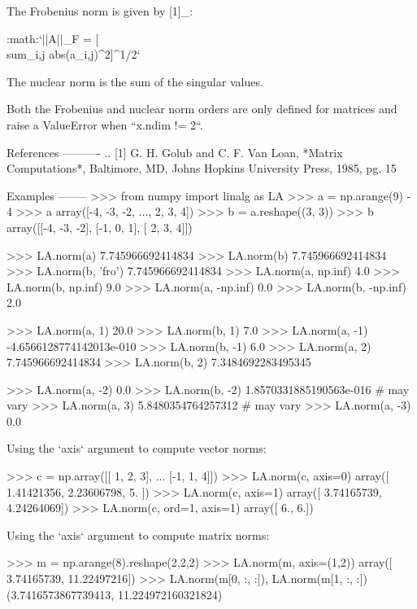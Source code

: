 \begin{DoxyVerb}
The Frobenius norm is given by [1]_:

    :math:`||A||_F = [\\sum_{i,j} abs(a_{i,j})^2]^{1/2}`

The nuclear norm is the sum of the singular values.

Both the Frobenius and nuclear norm orders are only defined for
matrices and raise a ValueError when ``x.ndim != 2``.

References
----------
.. [1] G. H. Golub and C. F. Van Loan, *Matrix Computations*,
       Baltimore, MD, Johns Hopkins University Press, 1985, pg. 15

Examples
--------
>>> from numpy import linalg as LA
>>> a = np.arange(9) - 4
>>> a
array([-4, -3, -2, ...,  2,  3,  4])
>>> b = a.reshape((3, 3))
>>> b
array([[-4, -3, -2],
       [-1,  0,  1],
       [ 2,  3,  4]])

>>> LA.norm(a)
7.745966692414834
>>> LA.norm(b)
7.745966692414834
>>> LA.norm(b, 'fro')
7.745966692414834
>>> LA.norm(a, np.inf)
4.0
>>> LA.norm(b, np.inf)
9.0
>>> LA.norm(a, -np.inf)
0.0
>>> LA.norm(b, -np.inf)
2.0

>>> LA.norm(a, 1)
20.0
>>> LA.norm(b, 1)
7.0
>>> LA.norm(a, -1)
-4.6566128774142013e-010
>>> LA.norm(b, -1)
6.0
>>> LA.norm(a, 2)
7.745966692414834
>>> LA.norm(b, 2)
7.3484692283495345

>>> LA.norm(a, -2)
0.0
>>> LA.norm(b, -2)
1.8570331885190563e-016 # may vary
>>> LA.norm(a, 3)
5.8480354764257312 # may vary
>>> LA.norm(a, -3)
0.0

Using the `axis` argument to compute vector norms:

>>> c = np.array([[ 1, 2, 3],
...               [-1, 1, 4]])
>>> LA.norm(c, axis=0)
array([ 1.41421356,  2.23606798,  5.        ])
>>> LA.norm(c, axis=1)
array([ 3.74165739,  4.24264069])
>>> LA.norm(c, ord=1, axis=1)
array([ 6.,  6.])

Using the `axis` argument to compute matrix norms:

>>> m = np.arange(8).reshape(2,2,2)
>>> LA.norm(m, axis=(1,2))
array([  3.74165739,  11.22497216])
>>> LA.norm(m[0, :, :]), LA.norm(m[1, :, :])
(3.7416573867739413, 11.224972160321824)\end{DoxyVerb}
 \mbox{\label{namespacenumpy_1_1linalg_1_1linalg_ab0895f5825444e6ab48e3fa77468eeb4}} 
